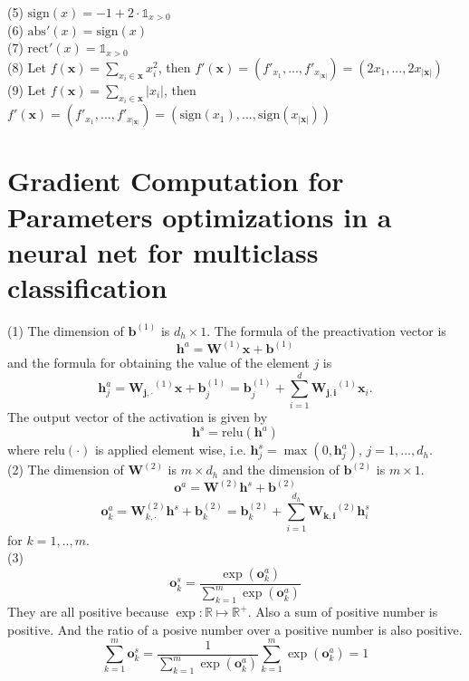 \documentclass[11pt,english]{article}
\newcommand{\real}{\mathbb{R}}
\newcommand{\sign}{\mathrm{sign}}
\newcommand{\abs}{\mathrm{abs}}
\newcommand{\rect}{\mathrm{rect}}
\newcommand{\relu}{\mathrm{relu}}
\begin{document}
(5) $\sign(x) = -1 + 2\cdot \mathbb{1}_{x>0}$ \\

(6) $\abs'(x)=\sign(x)$\\

(7) $\rect'(x) = \mathbb{1}_{x>0}$ \\

(8) Let $f(\bm{x})=\sum_{x_i \in \bm{x}} x_i^2$, then $f'(\bm{x})=(f'_{x_1},...,f'_{x_{|\bm{x}|}})=(2x_1,...,2x_{|\bm{x}|})$\\

(9) Let $f(\bm{x})=\sum_{x_i \in \bm{x}} |x_i|$, then $f'(\bm{x})=(f'_{x_1},...,f'_{x_{|\bm{x}|}})=(\sign(x_1),...,\sign(x_{|\bm{x}|}))$\\

\section*{Gradient Computation for Parameters optimizations in a neural net for multiclass classification}

(1) The dimension of $\bm{b}^{(1)}$ is $d_h \times 1$. The formula of the preactivation vector is 
\[
	\bm{h}^a = \bm{W}^{(1)}\bm{x} + \bm{b}^{(1)} 
\]
and the formula for obtaining the value of the element $j$ is
\[
	\bm{h}_j^a = \bm{W_{j,\cdot}}^{(1)}\bm{x} + \bm{b}_j^{(1)}
	=\bm{b}_j^{(1)} + \sum_{i=1}^d \bm{W_{j,i}}^{(1)}\bm{x}_i.
\]
The output vector of the activation is given by
\[
	\bm{h}^s = \relu(\bm{h}^a)
\]
where $\relu(\cdot)$ is applied element wise, i.e. $\bm{h}_j^s = \max(0, \bm{h}_j^a)$, $j=1,...,d_h$.\\

(2) The dimension of $\bm{W}^{(2)}$ is $m \times d_h$ and the dimension of $\bm{b}^{(2)}$ is $m \times 1$. 
\[
	\bm{o}^a = \bm{W}^{(2)}\bm{h}^s + \bm{b}^{(2)}
\]
\[
	\bm{o}_k^a 
	= \bm{W}_{k,\cdot}^{(2)}\bm{h}^s + \bm{b}_k^{(2)}
	= \bm{b}_k^{(2)} + \sum_{i=1}^{d_h} \bm{W_{k,i}}^{(2)}\bm{h}^s_i
\]
for $k=1,..,m$.\\

(3) 
\begin{equation}
	\bm{o}^s_k = \frac{\exp(\bm{o}_k^a)}{\sum_{k=1}^m \exp(\bm{o}_k^a)}
	\label{eq:softmax}
\end{equation}
They are all positive because $\exp\colon \real \mapsto \real^+$. Also a sum of positive number is positive. And the ratio of a posive number over a positive number is also positive.
\[
	\sum_{k=1}^m \bm{o}^s_k = \frac{1}{\sum_{k=1}^m \exp(\bm{o}_k^a)} \sum_{k=1}^m \exp(\bm{o}_k^a)=1  	
\]
\end{document}
